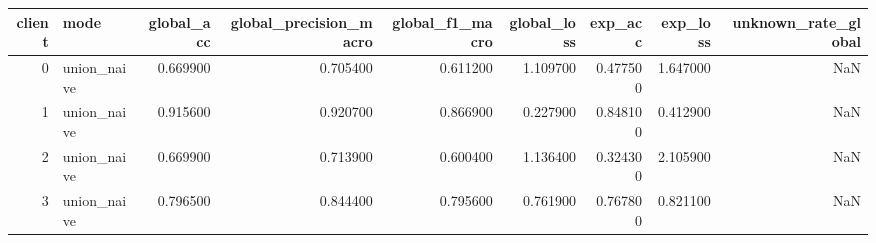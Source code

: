 \begin{tabular}{rlrrrrrrr}
\toprule
client & mode & global_acc & global_precision_macro & global_f1_macro & global_loss & exp_acc & exp_loss & unknown_rate_global \\
\midrule
0 & union_naive & 0.669900 & 0.705400 & 0.611200 & 1.109700 & 0.477500 & 1.647000 & NaN \\
1 & union_naive & 0.915600 & 0.920700 & 0.866900 & 0.227900 & 0.848100 & 0.412900 & NaN \\
2 & union_naive & 0.669900 & 0.713900 & 0.600400 & 1.136400 & 0.324300 & 2.105900 & NaN \\
3 & union_naive & 0.796500 & 0.844400 & 0.795600 & 0.761900 & 0.767800 & 0.821100 & NaN \\
\bottomrule
\end{tabular}
